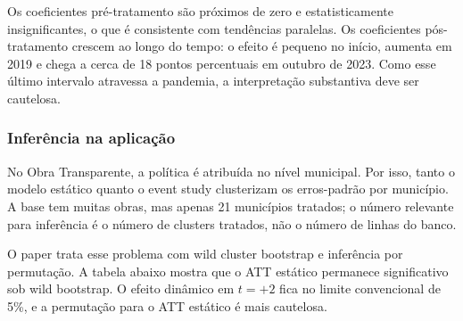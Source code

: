 \documentclass[
]{article}
\begin{document}
Os coeficientes pré-tratamento são próximos de zero e estatisticamente insignificantes, o que é consistente com tendências paralelas. Os coeficientes pós-tratamento crescem ao longo do tempo: o efeito é pequeno no início, aumenta em 2019 e chega a cerca de 18 pontos percentuais em outubro de 2023. Como esse último intervalo atravessa a pandemia, a interpretação substantiva deve ser cautelosa.

\subsubsection{Inferência na aplicação}\label{inferuxeancia-na-aplicauxe7uxe3o}

No Obra Transparente, a política é atribuída no nível municipal. Por isso, tanto o modelo estático quanto o event study clusterizam os erros-padrão por município. A base tem muitas obras, mas apenas 21 municípios tratados; o número relevante para inferência é o número de clusters tratados, não o número de linhas do banco.

O paper trata esse problema com wild cluster bootstrap e inferência por permutação. A tabela abaixo mostra que o ATT estático permanece significativo sob wild bootstrap. O efeito dinâmico em \(t=+2\) fica no limite convencional de 5\%, e a permutação para o ATT estático é mais cautelosa.
\end{document}
